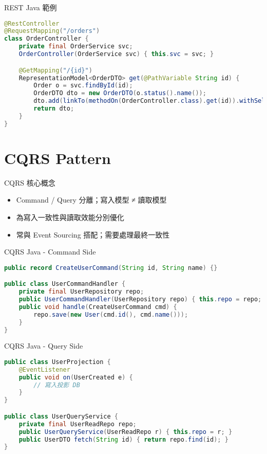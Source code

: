 \documentclass[UTF8]{beamer}
\begin{document}
\begin{frame}[fragile]{REST Java 範例}
    \begin{lstlisting}[language=Java]
@RestController
@RequestMapping("/orders")
class OrderController {
    private final OrderService svc;
    OrderController(OrderService svc) { this.svc = svc; }

    @GetMapping("/{id}")
    RepresentationModel<OrderDTO> get(@PathVariable String id) {
        Order o = svc.findById(id);
        OrderDTO dto = new OrderDTO(o.status().name());
        dto.add(linkTo(methodOn(OrderController.class).get(id)).withSelfRel());
        return dto;
    }
}
\end{lstlisting}
\end{frame}

\section{CQRS Pattern}
\begin{frame}{CQRS 核心概念}
    \begin{itemize}
        \item Command / Query 分離；寫入模型 ≠ 讀取模型
        \item 為寫入一致性與讀取效能分別優化
        \item 常與 Event Sourcing 搭配；需要處理最終一致性
    \end{itemize}
\end{frame}

\begin{frame}[fragile]{CQRS Java - Command Side}
    \begin{lstlisting}[language=Java]
public record CreateUserCommand(String id, String name) {}

public class UserCommandHandler {
    private final UserRepository repo;
    public UserCommandHandler(UserRepository repo) { this.repo = repo; }
    public void handle(CreateUserCommand cmd) {
        repo.save(new User(cmd.id(), cmd.name()));
    }
}
\end{lstlisting}
\end{frame}

\begin{frame}[fragile]{CQRS Java - Query Side}
    \begin{lstlisting}[language=Java]
public class UserProjection {
    @EventListener
    public void on(UserCreated e) {
        // 寫入投影 DB
    }
}

public class UserQueryService {
    private final UserReadRepo repo;
    public UserQueryService(UserReadRepo r) { this.repo = r; }
    public UserDTO fetch(String id) { return repo.find(id); }
}
\end{lstlisting}
\end{frame}
\end{document}
